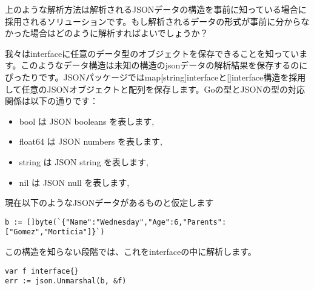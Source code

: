 上のような解析方法は解析されるJSONデータの構造を事前に知っている場合に採用されるソリューションです。もし解析されるデータの形式が事前に分からなかった場合はどのように解析すればよいでしょうか？

我々はinterface{}に任意のデータ型のオブジェクトを保存できることを知っています。このようなデータ構造は未知の構造のjsonデータの解析結果を保存するのにぴったりです。JSONパッケージではmap[string]interface{}と[]interface{}構造を採用して任意のJSONオブジェクトと配列を保存します。Goの型とJSONの型の対応関係は以下の通りです：

\begin{itemize}
  \item bool は JSON booleans を表します,
  \item float64 は JSON numbers を表します,
  \item string は JSON string を表します,
  \item nil は JSON null を表します,
\end{itemize}

現在以下のようなJSONデータがあるものと仮定します

\begin{lstlisting}[numbers=none]
b := []byte(`{"Name":"Wednesday","Age":6,"Parents":["Gomez","Morticia"]}`)
\end{lstlisting}

この構造を知らない段階では、これをinterface{}の中に解析します。

\begin{lstlisting}[numbers=none]
var f interface{}
err := json.Unmarshal(b, &f)
\end{lstlisting}

